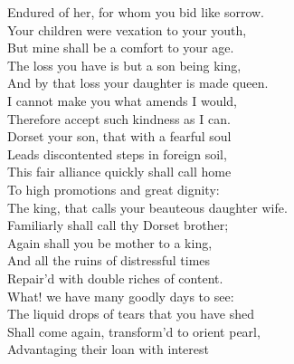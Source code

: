 \documentclass{article}
\begin{document}
\begin{description}
\hspace{1pt}Endured of her, for whom you bid like sorrow.\\
\hspace{1pt}Your children were vexation to your youth,\\
\hspace{1pt}But mine shall be a comfort to your age.\\
\hspace{1pt}The loss you have is but a son being king,\\
\hspace{1pt}And by that loss your daughter is made queen.\\
\hspace{1pt}I cannot make you what amends I would,\\
\hspace{1pt}Therefore accept such kindness as I can.\\
\hspace{1pt}Dorset your son, that with a fearful soul\\
\hspace{1pt}Leads discontented steps in foreign soil,\\
\hspace{1pt}This fair alliance quickly shall call home\\
\hspace{1pt}To high promotions and great dignity:\\
\hspace{1pt}The king, that calls your beauteous daughter wife.\\
\hspace{1pt}Familiarly shall call thy Dorset brother;\\
\hspace{1pt}Again shall you be mother to a king,\\
\hspace{1pt}And all the ruins of distressful times\\
\hspace{1pt}Repair'd with double riches of content.\\
\hspace{1pt}What! we have many goodly days to see:\\
\hspace{1pt}The liquid drops of tears that you have shed\\
\hspace{1pt}Shall come again, transform'd to orient pearl,\\
\hspace{1pt}Advantaging their loan with interest\\

\end{description}
\end{document}
